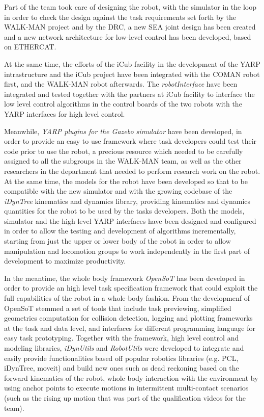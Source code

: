 \documentclass[%
	paper=A4,					%
	twoside=true,				%
	openright,			.
	parskip=full,				%
	chapterprefix=true,			%
	11pt,						%
	headings=normal,			%
	bibliography=totoc,			%
	listof=totoc,				%
	titlepage=on,				%
	captions=tableabove,		%
	draft=false,				%
]{scrreprt}%
\begin{document}
Part of the team took care of designing the robot, with the simulator in the loop in order to check the design against the task requirements set forth by the WALK-MAN project and by the DRC, a new SEA joint design has been created and a new network architecture for low-level control has been developed, based on ETHERCAT. 

At the same time, the efforts of the iCub facility in the development of the YARP intrastructure and the iCub project have been integrated with the COMAN robot first, and the WALK-MAN robot afterwards. The \emph{robotInterface} have been integrated and tested together with the partners at iCub facility to interface the low level control algorithms in the control boards of the two robots with the YARP interfaces for high level control. 

Meanwhile, \emph{YARP plugins for the Gazebo simulator} have been developed, in order to provide an easy to use framework where task developers could test their code prior to use the robot, a precious resource which needed to be carefully assigned to all the subgroups in the WALK-MAN team, as well as the other researchers in the department that needed to perform research work on the robot. At the same time, the models for the robot have been developed so that to be compatible with the new simulator and with the growing codebase of the \emph{iDynTree} kinematics and dynamics library, providing kinematics and dynamics quantities for the robot to be used by the tasks developers. Both the models, simulator and the high level YARP interfaces have been designed and configured in order to allow the testing and development of algorithms incrementally, starting from just the upper or lower body of the robot in order to allow manipulation and locomotion groups to work independently in the first part of development to maximize productivity. 

In the meantime, the whole body framework \emph{OpenSoT} has been developed in order to provide an high level task specification framework that could exploit the full capabilities of the robot in a whole-body fashion. From the developmenf of OpenSoT stemmed a set of tools that include task previewing, simplified geometries computation for collision detection, logging and plotting frameworks at the task and data level, and interfaces for different programming language for easy task prototyping. Together with the framework, high level control and modeling libraries, \emph{iDynUtils} and \emph{RobotUtils} were developed to integrate and easily provide functionalities based off popular robotics libraries (e.g. PCL, iDynTree, moveit) and build new ones such as dead reckoning based on the forward kinematics of the robot, whole body interaction with the environment by using anchor points to execute motions in intermittent multi-contact scenarios (such as the rising up motion that was part of the qualification videos for the team). 
\end{document}
